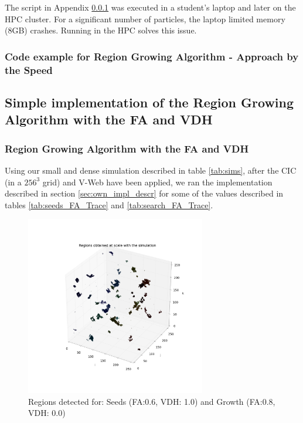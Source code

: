 \documentclass[12pt]{article}
\begin{document}
The script in Appendix \ref{App:App_speed_code} was executed in a student's
laptop and later on the HPC cluster. For a significant number of particles, the laptop limited memory (8GB) crashes. Running in the HPC solves this issue.


\subsubsection{Code example for Region Growing Algorithm - Approach by the Speed} \label{App:App_speed_code}
\tiny




\subsection{Simple implementation of the Region Growing Algorithm with the FA and VDH}

\subsubsection{Region Growing Algorithm with the FA and VDH} \label{sec:results_own_impl}
\begin{par}
Using our small and dense simulation described in
 table \ref{tab:sims}, after the CIC (in a
  $256^3$ grid) and V-Web have been applied,
   we ran the implementation described in section
    \ref{sec:own_impl_descr} for some of the
     values described in tables
      \ref{tab:seeds_FA_Trace} and
       \ref{tab:search_FA_Trace}. 
\end{par}

\begin{figure}[ht]
\begin{center}
\includegraphics[width=0.7\textwidth]{groups/firstimplementation/regions_3D_129.png} %
\caption{Regions detected for: Seeds (FA:0.6, VDH: 1.0) and Growth (FA:0.8, VDH: 0.0) }
\label{fg:first_3D_all}
\end{center}
\end{figure}
\FloatBarrier
\end{document}
